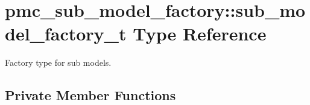 \hypertarget{structpmc__sub__model__factory_1_1sub__model__factory__t}{}\section{pmc\+\_\+sub\+\_\+model\+\_\+factory\+:\+:sub\+\_\+model\+\_\+factory\+\_\+t Type Reference}
\label{structpmc__sub__model__factory_1_1sub__model__factory__t}


Factory type for sub models.  


\subsection*{Private Member Functions}
